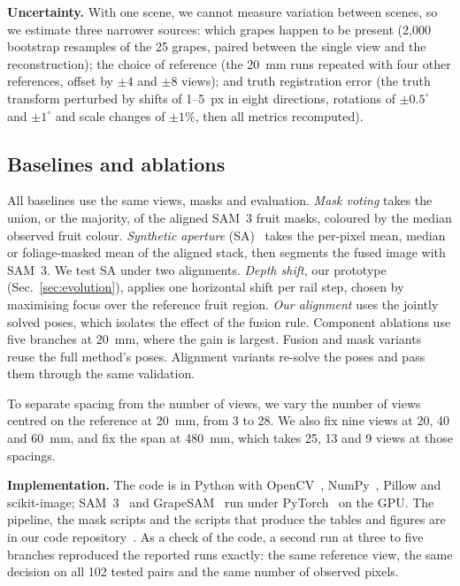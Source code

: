 \textbf{Uncertainty.} With one scene, we cannot measure variation between scenes, so we estimate three narrower sources: which grapes happen to be present (2,000 bootstrap resamples of the 25 grapes, paired between the single view and the reconstruction); the choice of reference (the 20~mm runs repeated with four other references, offset by $\pm4$ and $\pm8$ views); and truth registration error (the truth transform perturbed by shifts of 1--5~px in eight directions, rotations of $\pm0.5^\circ$ and $\pm1^\circ$ and scale changes of $\pm1\%$, then all metrics recomputed).

\subsection{Baselines and ablations}
All baselines use the same views, masks and evaluation. \emph{Mask voting} takes the union, or the majority, of the aligned SAM~3 fruit masks, coloured by the median observed fruit colour. \emph{Synthetic aperture} (SA)~\cite{vaish2006} takes the per-pixel mean, median or foliage-masked mean of the aligned stack, then segments the fused image with SAM~3. We test SA under two alignments. \emph{Depth shift}, our prototype (Sec.~\ref{sec:evolution}), applies one horizontal shift per rail step, chosen by maximising focus over the reference fruit region. \emph{Our alignment} uses the jointly solved poses, which isolates the effect of the fusion rule. Component ablations use five branches at 20~mm, where the gain is largest. Fusion and mask variants reuse the full method's poses. Alignment variants re-solve the poses and pass them through the same validation.

To separate spacing from the number of views, we vary the number of views centred on the reference at 20~mm, from 3 to 28. We also fix nine views at 20, 40 and 60~mm, and fix the span at 480~mm, which takes 25, 13 and 9 views at those spacings.

\textbf{Implementation.} The code is in Python with OpenCV~\cite{opencv}, NumPy~\cite{numpy}, Pillow and scikit-image; SAM~3~\cite{sam3code} and GrapeSAM~\cite{tong2026vivid,grapesamcode} run under PyTorch~\cite{pytorch} on the GPU. The pipeline, the mask scripts and the scripts that produce the tables and figures are in our code repository~\cite{teamrepo}. As a check of the code, a second run at three to five branches reproduced the reported runs exactly: the same reference view, the same decision on all 102 tested pairs and the same number of observed pixels.
